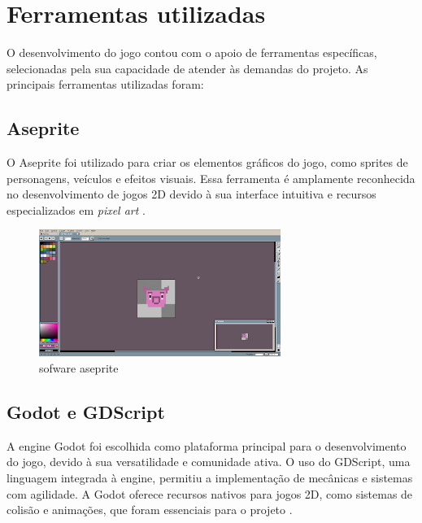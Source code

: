 \chapter[Ferramentas utilizadas]{Ferramentas utilizadas}

O desenvolvimento do jogo contou com o apoio de ferramentas específicas, selecionadas pela sua capacidade de atender às demandas do projeto. As principais ferramentas utilizadas foram:

\section{Aseprite}

O Aseprite foi utilizado para criar os elementos gráficos do jogo, como sprites de personagens, veículos e efeitos visuais. Essa ferramenta é amplamente reconhecida no desenvolvimento de jogos 2D devido à sua interface intuitiva e recursos especializados em \textit{pixel art} \cite{aseprite}.

\begin{figure}[htbp]
    \centering
    \caption{sofware aseprite}
    \label{fig:asesprite}
    \includegraphics[width=0.7\textwidth]{figuras/asesprite.png}
\end{figure}

\section{Godot e GDScript}

A engine Godot foi escolhida como plataforma principal para o desenvolvimento do jogo, devido à sua versatilidade e comunidade ativa. O uso do GDScript, uma linguagem integrada à engine, permitiu a implementação de mecânicas e sistemas com agilidade. A Godot oferece recursos nativos para jogos 2D, como sistemas de colisão e animações, que foram essenciais para o projeto \cite{godot}.

